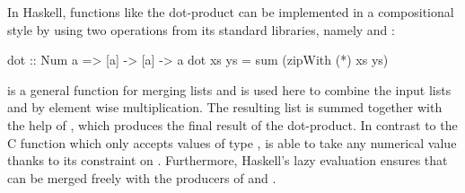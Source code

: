 \documentclass[../main.tex]{subfiles}
\begin{document}
In Haskell, functions like the dot-product can be implemented in a compositional style by using two operations from its standard libraries, namely  and :

\begin{code}
dot :: Num a => [a] -> [a] -> a
dot xs ys = sum (zipWith (*) xs ys)
\end{code}

\noindent {} is a general function for merging lists and is used here to combine the input lists  and  by element wise multiplication. The resulting list is summed together with the help of , which produces the final result of the dot-product. In contrast to the C function which only accepts values of type ,  is able to take any numerical value thanks to its  constraint on . Furthermore, Haskell's lazy evaluation ensures that  can be merged freely with the producers of  and .



%




\end{document}
